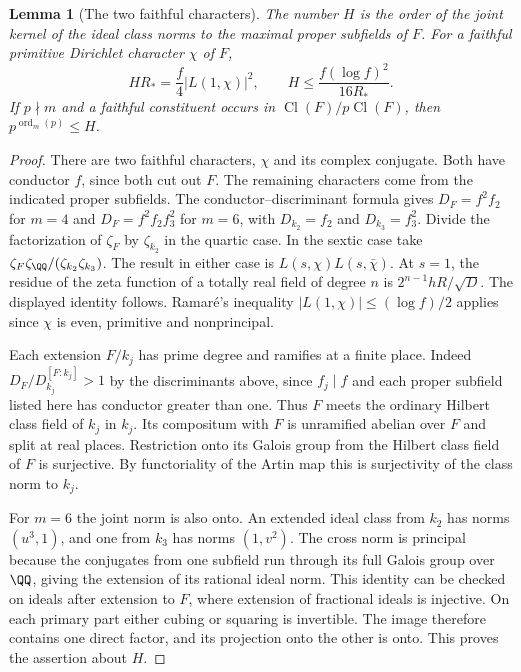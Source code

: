 \documentclass[a4paper,11pt]{article}
\newtheorem{lemma}[proposition]{Lemma}
\theoremstyle{definition}
\theoremstyle{remark}
\numberwithin{equation}{section}
\newcommand{\Cl}{\operatorname{Cl}}
\begin{document}
\begin{lemma}[The two faithful characters]\label{lem:relative195}
The number \(H\) is the order of the joint kernel of the ideal class
norms to the maximal proper subfields of \(F\). For a faithful
primitive Dirichlet character \(\chi\) of \(F\),
\[
              H R_* = \frac f4 |L(1,\chi)|^2,
      \qquad H \le \frac{f(\log f)^2}{16 R_*}.
\]
If \(p\nmid m\) and a faithful constituent occurs in \(\Cl(F)/p\Cl(F)\),
then \(p^{\operatorname{ord}_m(p)}\le H\).
\end{lemma}
\begin{proof}
There are two faithful characters, \(\chi\) and its complex conjugate.
Both have conductor \(f\), since both cut out \(F\). The remaining
characters come from the indicated proper subfields. The
conductor--discriminant formula gives \(D_F=f^2 f_2\) for \(m=4\)
and \(D_F=f^2 f_2 f_3^2\) for \(m=6\), with \(D_{k_2}=f_2\) and
\(D_{k_3}=f_3^2\). Divide the factorization of \(\zeta_F\) by
\(\zeta_{k_2}\) in the quartic case. In the sextic case take
\(\zeta_F\zeta_{\QQ}/(\zeta_{k_2}\zeta_{k_3})\). The result in
either case is \(L(s,\chi)L(s,\bar\chi)\). At \(s=1\), the
residue of the zeta function of a totally real field of degree
\(n\) is \(2^{n-1}hR/\sqrt D\). The displayed identity follows.
Ramar\'e's inequality \(|L(1,\chi)|\le(\log f)/2\) applies since
\(\chi\) is even, primitive and nonprincipal.~\cite[Cor.~1]{V-III-V-ramare105}

Each extension \(F/k_j\) has prime degree and ramifies at a finite
place. Indeed \(D_F/D_{k_j}^{[F:k_j]}>1\) by the discriminants
above, since \(f_j\mid f\) and each proper subfield listed here has
conductor greater than one. Thus \(F\) meets the ordinary Hilbert
class field of \(k_j\) in \(k_j\). Its compositum with \(F\) is
unramified abelian over \(F\) and split at real places. Restriction
onto its Galois group from the Hilbert class field of \(F\) is
surjective. By functoriality of the Artin map this is surjectivity
of the class norm to \(k_j\).~\cite{V-III-V-cft101}

For \(m=6\) the joint norm is also onto. An extended ideal class
from \(k_2\) has norms \((u^3,1)\), and one from \(k_3\) has
norms \((1,v^2)\). The cross norm is principal because the
conjugates from one subfield run through its full Galois group
over \(\QQ\), giving the extension of its rational ideal norm.
This identity can be checked on ideals after extension to \(F\),
where extension of fractional ideals is injective. On each primary
part either cubing or squaring is invertible. The image therefore
contains one direct factor, and its projection onto the other is
onto. This proves the assertion about \(H\).


\end{proof}
\end{document}
